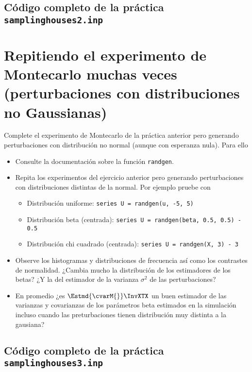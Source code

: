 \documentclass[11pt]{article}
\begin{document}
\subsection{Código completo de la práctica \texttt{samplinghouses2.inp}}
\label{sec:orgb536e4f}
\vspace{10pt}

\clearpage


\section{Repitiendo el experimento de Montecarlo muchas veces (perturbaciones con distribuciones no Gaussianas)}
\label{sec:org516fdce}
Complete el experimento de Montecarlo de la práctica anterior pero
generando perturbaciones con distribución no normal (aunque con
esperanza nula). Para ello

\begin{itemize}
\item Consulte la documentación sobre la función \texttt{randgen}.

\item Repita los experimentos del ejercicio anterior pero generando
perturbaciones con distribuciones distintas de la normal. Por
ejemplo pruebe con

\begin{itemize}
\item Distribución uniforme: \texttt{series U = randgen(u, -5, 5)}

\item Distribución beta (centrada): \texttt{series U = randgen(beta, 0.5, 0.5) - 0.5}

\item Distribución chi cuadrado (centrada): \texttt{series U = randgen(X, 3) - 3}
\end{itemize}

\item Observe los histogramas y distribuciones de frecuencia así como los
contrastes de normalidad. ¿Cambia mucho la distribución de los
estimadores de los betas? ¿Y la del estimador de la varianza
\(\sigma^2\) de las perturbaciones?

\item En promedio ¿es \(\Estmd{\cvarM{}}\InvXTX\) un buen estimador de las
varianzas y covarianzas de los parámetros beta estimados en la
simulación incluso cuando las preturbaciones tienen distribución muy
distinta a la gausiana?
\end{itemize}

\vspace{10pt}
\noindent
\subsection{Código completo de la práctica \texttt{samplinghouses3.inp}}
\label{sec:org7b8ec90}
\vspace{10pt}

\clearpage
\end{document}
